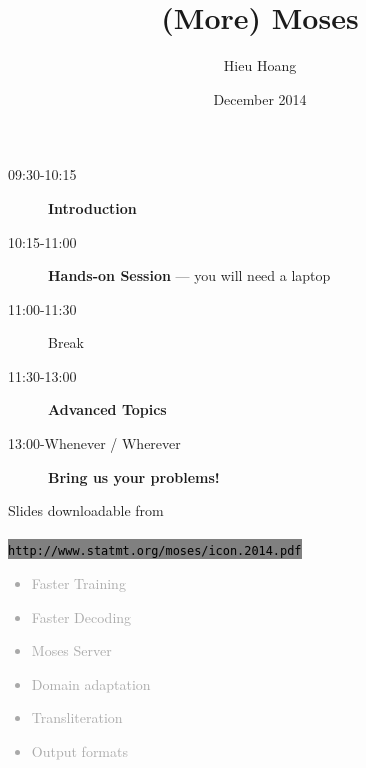 \documentclass[landscape]{uedslides2C}
\newcommand{\littlecode}[1]{\colorbox{gray}{\textcolor{black}{\small \tt #1}}}
\begin{document}
\title[(More) Machine Translation with]{{\sc \huge (More) Moses}\\[3mm]}
\author[Hoang, Huck and Koehn]{Hieu Hoang}
\date{\vspace{-5mm}December 2014}
\maketitle


\vfill

\begin{description}
\item[\small 09:30-10:15 $\;\;$] {\bf Introduction} %
\item[\small 10:15-11:00 $\;\;$] {\bf Hands-on Session} --- you will need a laptop
\item[\small 11:00-11:30 $\;\;$] Break
\item[\small 11:30-13:00 $\;\;$] {\bf Advanced Topics}
\item[\small 13:00-Whenever / Wherever $\;\;$] {\bf Bring us your problems!}
\end{description}
\vfill

Slides downloadable from \\ \\
\littlecode{\normalsize http://www.statmt.org/moses/icon.2014.pdf} %
\\
\vfill


\vspace{-5mm}
\textcolor{darkgrey}{
\begin{itemize} \itemsep -1mm
\item {Faster Training}
\item {Faster Decoding}
\item {Moses Server}
\item {Domain adaptation}
\item {Transliteration}
\item {Output formats}
\end{itemize}
}

\end{document}
